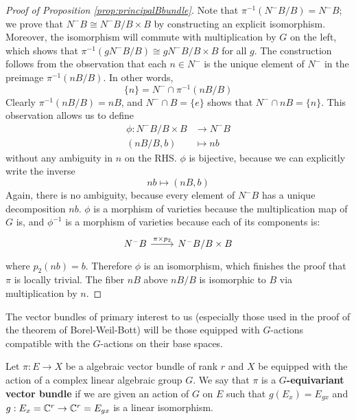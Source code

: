 \begin{proof}[Proof of Proposition \ref{prop:principalBbundle}]
Note that $\pi^{-1}(N^-B / B) = N^- B$; we prove
that $N^- B \cong N^-B / B \times B$ by constructing an explicit isomorphism. Moreover, the isomorphism will
commute with multiplication by $G$ on the left, which shows that $\pi^{-1}(gN^-B / B) \cong gN^-B / B \times B$
for all $g$. The construction follows from the observation that each $n\in N^-$ is the unique element
of $N^-$ in the preimage $\pi^{-1}(nB/B)$. In other words,
\begin{equation}
\label{uniquen}
\{n\} = N^- \cap \pi^{-1}(nB/B)
\end{equation}
Clearly $\pi^{-1}(nB/B) = nB$, and $N^- \cap B = \{e\}$ shows that $N^- \cap nB = \{n\}$. This observation allows
us to define
\begin{align*}
\phi : N^- B/B \times B &\to N^-B 	\\
(nB/B, b) &\mapsto nb
\end{align*}
without any ambiguity in $n$ on the RHS. $\phi$ is bijective, because we can explicitly write the inverse
\[	nb \mapsto (nB, b)	\]
Again, there is no ambiguity, because every element of $N^-B$ has a unique decomposition $nb$. $\phi$ is a morphism
of varieties because the multiplication map of $G$ is, and $\phi^{-1}$ is a morphism of varieties because each of its
components is:
\[
\begin{tikzcd}
N^-B \arrow{r}{\pi \times p_2} & N^-B/B \times B
\end{tikzcd}
\]
where $p_2(nb) = b$. Therefore $\phi$ is an isomorphism, which finishes the proof that $\pi$ is locally trivial. The
fiber $nB$ above $nB/B$ is isomorphic to $B$ via multiplication by $n$.
\end{proof}

The vector bundles of primary interest to us (especially those used in the proof of the theorem of Borel-Weil-Bott)
will be those equipped with $G$-actions compatible with the $G$-actions on their base spaces.
\begin{definition}
    Let $\pi:E\to X$ be a algebraic vector bundle of rank $r$ and $X$ be equipped with the action of a complex
    linear algebraic group $G$. We say that $\pi$ is a \textbf{$G$-equivariant vector bundle} if 
    we are given an action of $G$ on $E$ such that $g(E_x)=E_{gx}$ and $g:E_x=\mathbb{C}^r\to \mathbb{C}^r=E_{gx}$ is a
    linear isomorphism.
\end{definition}


